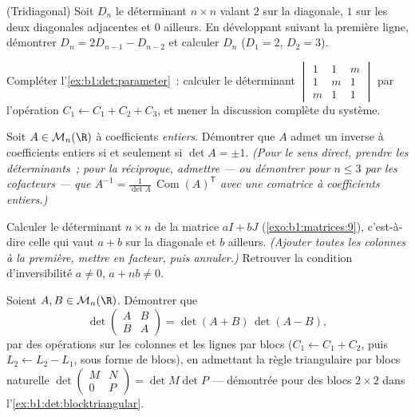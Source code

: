 \begin{exercise}[$\star\star$]\label{exo:b1:det:6}
(Tridiagonal) Soit $D_n$ le déterminant $n \times n$ valant $2$ sur
la diagonale, $1$ sur les deux diagonales adjacentes et $0$ ailleurs.
En développant suivant la première ligne, démontrer $D_n = 2D_{n-1} -
D_{n-2}$ et calculer $D_n$ ($D_1 = 2$, $D_2 = 3$).
\end{exercise}

\begin{exercise}[$\star\star$]\label{exo:b1:det:7}
Compléter l'\cref{ex:b1:det:parameter}~: calculer le déterminant
$\begin{vmatrix} 1 & 1 & m\\ 1 & m & 1\\ m & 1 & 1\end{vmatrix}$
par l'opération $C_1 \leftarrow C_1 + C_2 + C_3$, et mener la
discussion complète du système.
\end{exercise}

\begin{exercise}[$\star\star$]\label{exo:b1:det:8}
Soit $A \in \mathcal{M}_n(\R)$ à coefficients \emph{entiers}.
Démontrer que $A$ admet un inverse à coefficients entiers si et
seulement si $\det A = \pm 1$. \emph{(Pour le sens direct, prendre les
déterminants~; pour la réciproque, admettre --- ou démontrer pour
$n \leq 3$ par les cofacteurs --- que
$A^{-1} = \frac{1}{\det A}\,\operatorname{Com}(A)^{\mathsf T}$ avec une
comatrice à coefficients entiers.)}
\end{exercise}

\begin{exercise}[$\star\star\star$]\label{exo:b1:det:9}
Calculer le déterminant $n \times n$ de la matrice $aI + bJ$
(\cref{exo:b1:matrices:9}), c'est-à-dire celle qui vaut $a + b$ sur la
diagonale et $b$ ailleurs. \emph{(Ajouter toutes les colonnes à la
première, mettre en facteur, puis annuler.)} Retrouver la condition
d'inversibilité $a \neq 0$, $a + nb \neq 0$.
\end{exercise}

\begin{exercise}[$\star\star\star$]\label{exo:b1:det:10}
Soient $A, B \in \mathcal{M}_n(\R)$. Démontrer que
\[
\det\begin{pmatrix} A & B\\ B & A \end{pmatrix}
= \det(A + B)\,\det(A - B),
\]
par des opérations sur les colonnes et les lignes par blocs
($C_1 \leftarrow C_1 + C_2$, puis $L_2 \leftarrow L_2 - L_1$, sous
forme de blocs), en admettant la règle triangulaire par blocs
naturelle $\det\begin{pmatrix} M & N\\ 0 &
P\end{pmatrix} = \det M \det P$ --- démontrée pour des blocs
$2 \times 2$ dans l'\cref{ex:b1:det:blocktriangular}.
\end{exercise}

